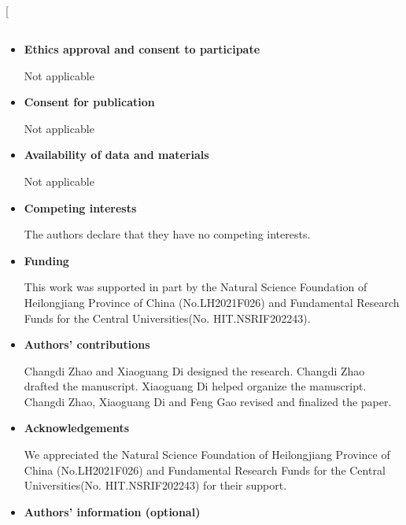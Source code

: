 \begin{sloppypar}
\def\bibfont{\fontsize{10.5}\selectfont}
% 
\twocolumn[
\begin{@twocolumnfalse}
\section*{}

\renewcommand{\labelitemi}{\textbullet}

\begin{itemize}

\setlength{\itemsep}{5pt}

\setlength{\parsep}{5pt}

\setlength{\parskip}{5pt}
\large \item \textbf{Ethics approval and consent to participate}

Not applicable

\item \textbf{Consent for publication}

Not applicable

\item \textbf{Availability of data and materials}

Not applicable

\item \textbf{Competing interests}

The authors declare that they have no competing interests.

\item \textbf{Funding}

This work was supported in part by the Natural Science Foundation of
Heilongjiang Province of China (No.LH2021F026) and Fundamental Research Funds for the Central Universities(No. HIT.NSRIF202243).

\item \textbf{Authors' contributions}

Changdi Zhao and Xiaoguang Di designed the research. Changdi Zhao drafted the manuscript. Xiaoguang Di helped organize the manuscript. Changdi Zhao, Xiaoguang Di and Feng Gao revised and finalized the paper.

\item \textbf{Acknowledgements}

We appreciated the Natural Science Foundation of Heilongjiang Province of China (No.LH2021F026) and Fundamental Research Funds for the Central
Universities(No. HIT.NSRIF202243) for their support.

\item \textbf{Authors' information (optional)}


\end{itemize}
\end{@twocolumnfalse}
\end{sloppypar}
